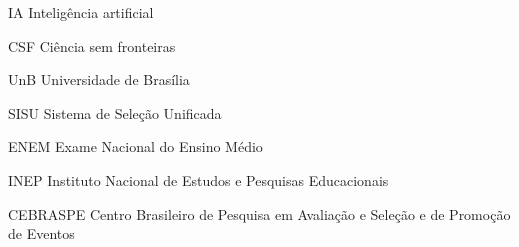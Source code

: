 \begin{basedescript}{\desclabelstyle{\pushlabel}\desclabelwidth{6em}}
\item[{IA}] Inteligência artificial%
\item[{CSF}] Ciência sem fronteiras%
\item[{UnB}] Universidade de Brasília %
\item[{SISU}] Sistema de Seleção Unificada %
\item[{ENEM}] Exame Nacional do Ensino Médio%
\item[{INEP}] Instituto Nacional de Estudos e Pesquisas Educacionais %
\item[{CEBRASPE}] Centro Brasileiro de Pesquisa em Avaliação e Seleção e de Promoção de Eventos%
\end{basedescript}